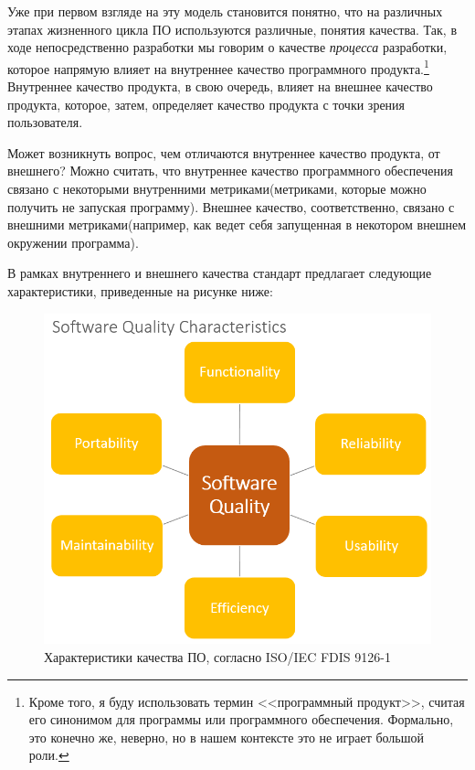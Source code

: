 Уже при первом взгляде на эту модель становится понятно, что на различных этапах жизненного цикла ПО используются различные, понятия качества. Так, в ходе непосредственно разработки мы говорим о качестве \textit{процесса} разработки, которое напрямую влияет на внутреннее качество программного продукта.\footnote{Кроме того, я буду использовать термин <<программный продукт>>, считая его синонимом для программы или программного обеспечения. Формально, это конечно же, неверно, но в нашем контексте это не играет большой роли.} Внутреннее качество продукта, в свою очередь, влияет на внешнее качество продукта, которое, затем, определяет качество продукта с точки зрения пользователя.

Может возникнуть вопрос, чем отличаются внутреннее качество продукта, от внешнего? Можно считать, что внутреннее качество программного обеспечения связано с некоторыми внутренними метриками(метриками, которые можно получить не запуская программу). Внешнее качество, соответственно, связано с внешними метриками(например, как ведет себя запущенная в некотором внешнем окружении программа).

В рамках внутреннего и внешнего качества стандарт предлагает следующие характеристики, приведенные на рисунке ниже:

\begin{figure}[H]
  \centering
  \includegraphics[width=\textwidth]{img/quality_model.png}
  \caption{Характеристики качества ПО, согласно ISO/IEC FDIS 9126-1}
\end{figure}

